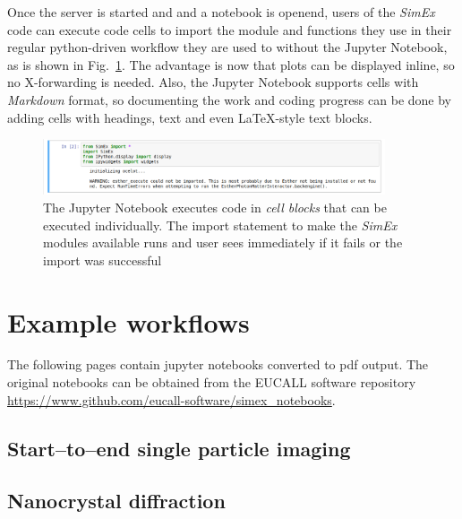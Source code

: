 \documentclass[10pt]{scrartcl}
\begin{document}
%
Once the server is started and and a notebook is openend, users of the \textit{SimEx} code can execute code cells
to import the module and functions they use in their regular python-driven workflow they are used to without the Jupyter Notebook, as is shown in Fig.~\ref{fig:simex_import}.
The advantage is now that plots can be displayed inline, so no X-forwarding is needed.
Also, the Jupyter Notebook supports cells with \textit{Markdown} format, so documenting the work and coding progress can be done by adding cells with headings, text and even \LaTeX -style text blocks.
%
\begin{figure}
 \centering
 \includegraphics[width=0.9\textwidth]{figures/simex_import_jhub.png}
 \caption{The Jupyter Notebook executes code in \textit{cell blocks} that can be executed individually. The import statement to make the \textit{SimEx} modules available runs and user sees immediately if it fails or the import was successful}
 \label{fig:simex_import}
\end{figure}
%
\FloatBarrier
\printbibliography[title={References}]
%
%
%
%
\FloatBarrier
\appendix
\section{Example workflows}
\label{appendix:notebooks}
The following pages contain jupyter notebooks converted to pdf output. The
original notebooks can be
obtained from the EUCALL software repository
\url{https://www.github.com/eucall-software/simex_notebooks}.
\subsection{Start--to--end single particle imaging}

%
\subsection{Nanocrystal diffraction}

%
\end{document}
